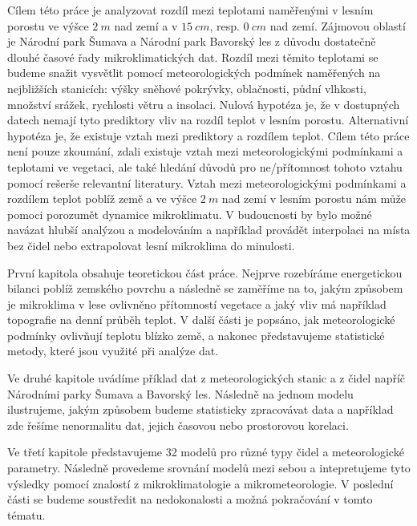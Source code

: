 Cílem této práce je analyzovat rozdíl mezi teplotami naměřenými v lesním porostu ve výšce $\SI{2}{m}$ nad zemí a v $\SI{15}{cm}$, resp. $\SI{0}{cm}$ nad zemí. Zájmovou oblastí je Národní park Šumava a Národní park Bavorský les z důvodu dostatečně dlouhé časové řady mikroklimatických dat. Rozdíl mezi těmito teplotami se budeme snažit vysvětlit pomocí meteorologických podmínek naměřených na nejbližších stanicích: výšky sněhové pokrývky, oblačnosti, půdní vlhkosti, množství srážek, rychlosti větru a insolaci. Nulová hypotéza je, že v dostupných datech nemají tyto prediktory vliv na rozdíl teplot v lesním porostu. Alternativní hypotéza je, že existuje vztah mezi prediktory a rozdílem teplot. Cílem této práce není pouze zkoumání, zdali existuje vztah mezi meteorologickými podmínkami a teplotami ve vegetaci, ale také hledání důvodů pro ne/přítomnost tohoto vztahu pomocí rešerše relevantní literatury. Vztah mezi meteorologickými podmínkami a rozdílem teplot poblíž země a ve výšce $\SI{2}{m}$ nad zemí v lesním porostu nám může pomoci porozumět dynamice mikroklimatu. V budoucnosti by bylo možné navázat hlubší analýzou a modelováním a například provádět interpolaci na místa bez čidel nebo extrapolovat lesní mikroklima do minulosti.

První kapitola obsahuje teoretickou část práce. Nejprve rozebíráme energetickou bilanci poblíž zemského povrchu a následně se zaměříme na to, jakým způsobem je mikroklima v lese ovlivněno přítomností vegetace a jaký vliv má například topografie na denní průběh teplot. V další části je popsáno, jak meteorologické podmínky ovlivňují teplotu blízko země, a nakonec představujeme statistické metody, které jsou využité při analýze dat.

Ve druhé kapitole uvádíme příklad dat z meteorologických stanic a z čidel napříč Národními parky Šumava a Bavorský les. Následně na jednom modelu ilustrujeme, jakým způsobem budeme statisticky zpracovávat data a například zde řešíme nenormalitu dat, jejich časovou nebo prostorovou korelaci.

Ve třetí kapitole představujeme 32 modelů pro různé typy čidel a meteorologické parametry. Následně provedeme srovnání modelů mezi sebou a intepretujeme tyto výsledky pomocí znalostí z mikroklimatologie a mikrometeorologie. V poslední části se budeme soustředit na nedokonalosti a možná pokračování v tomto tématu.

